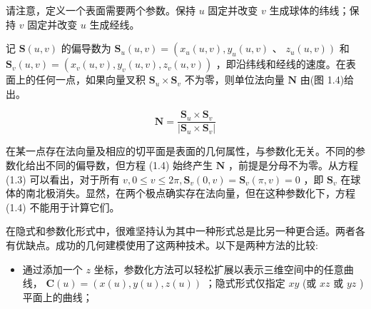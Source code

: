 \documentclass[../main.tex]{subfiles}
\begin{document}
请注意，定义一个表面需要两个参数。保持 \(u\) 固定并改变 \(v\) 生成球体的纬线；保持 \(v\) 固定并改变 \(u\) 生成经线。

\begin{center}
\begin{minipage}{10cm}
\centering
{}
\captionsetup{font=small,justification=centering,singlelinecheck=false,skip=6pt}
\end{minipage}
\end{center}

记 \(\mathbf{S}\left( {u,v}\right)\) 的偏导数为 \({\mathbf{S}}_{u}\left( {u,v}\right)  = \left( {{x}_{u}\left( {u,v}\right) ,{y}_{u}\left( {u,v}\right) }\right.\) 、 \(\left. {{z}_{u}\left( {u,v}\right) }\right)\) 和 \({\mathbf{S}}_{v}\left( {u,v}\right)  = \left( {{x}_{v}\left( {u,v}\right) ,{y}_{v}\left( {u,v}\right) ,{z}_{v}\left( {u,v}\right) }\right)\) ，即沿纬线和经线的速度。在表面上的任何一点，如果向量叉积 \({\mathbf{S}}_{u} \times  {\mathbf{S}}_{v}\) 不为零，则单位法向量 \(\mathbf{N}\) 由(图 1.4)给出。

\[
\mathbf{N} = \frac{{\mathbf{S}}_{u} \times  {\mathbf{S}}_{v}}{\left| {\mathbf{S}}_{u} \times  {\mathbf{S}}_{v}\right| } \tag{1.4}
\]

\begin{center}
\begin{minipage}{10cm}
\centering
{}
\captionsetup{font=small,justification=centering,singlelinecheck=false,skip=6pt}
\end{minipage}
\end{center}

在某一点存在法向量及相应的切平面是表面的几何属性，与参数化无关。不同的参数化给出不同的偏导数，但方程 (1.4) 始终产生 \(\mathbf{N}\) ，前提是分母不为零。从方程 (1.3) 可以看出，对于所有 \(v,0 \leq  v \leq  {2\pi },{\mathbf{S}}_{v}\left( {0,v}\right)  = {\mathbf{S}}_{v}\left( {\pi ,v}\right)  = 0\) ，即 \({\mathbf{S}}_{v}\) 在球体的南北极消失。显然，在两个极点确实存在法向量，但在这种参数化下，方程 (1.4) 不能用于计算它们。

在隐式和参数化形式中，很难坚持认为其中一种形式总是比另一种更合适。两者各有优缺点。成功的几何建模使用了这两种技术。以下是两种方法的比较:



\begin{itemize}
\item 通过添加一个 \(z\) 坐标，参数化方法可以轻松扩展以表示三维空间中的任意曲线， \(\mathbf{C}\left( u\right)  = \left( {x\left( u\right) ,y\left( u\right) ,z\left( u\right) }\right)\) ；隐式形式仅指定 \({xy}\) (或 \({xz}\) 或 \({yz}\) )平面上的曲线；
\end{itemize}
\end{document}
